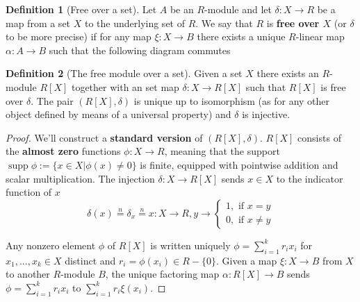 \documentclass[a4paper,12pt,parskip=half*,chapterprefix=true,numbers=noendperiod]{scrreprt}
\theoremstyle{definition}
\newtheorem{definition}{Definition}[section]
\theoremstyle{remark}
\begin{document}
\begin{definition}[Free over a set]
	Let $A$ be an $R$-module and let $\delta:X\to R$ be a map from a set $X$ to the underlying set of $R$. We say that $R$ is \textbf{free over $X$} (or $\delta$ to be more precise) if for any map $\xi:X\to B$ there exists a unique $R$-linear map $\alpha:A\to B$ such that the following diagram commutes
	\begin{figure}[H]
		\centering
	\end{figure}
\end{definition}

\begin{definition}[The free module over a set]
	Given a set $X$ there exists an $R$-module $R[X]$ together with an set map $\delta:X\to R[X]$ such that $R[X]$ is free over $\delta$. The pair $(R[X],\delta)$ is unique up to isomorphism (as for any other object defined by means of a universal property) and $\delta$ is injective.
\end{definition}
\begin{proof}
We'll construct a \textbf{standard version} of $(R[X],\delta)$. $R[X]$ consists of the \textbf{almost zero} functions $\phi:X\to R$, meaning that the support $\operatorname{supp}\phi:=\{x\in X|\phi(x)\neq 0\}$ is finite, equipped with pointwise addition and scalar multiplication. The injection $\delta:X\to R[X]$ sends $x\in X$ to the indicator function of $x$
\begin{equation*}
	\delta(x)\overset{n}{=}\delta_x\overset{n}{=}x:X\to R,y\to\begin{cases} 1,\text{ if }x=y\\
	0,\text{ if }x\neq y
	\end{cases}
\end{equation*}

Any nonzero element $\phi$ of $R[X]$ is written uniquely $\phi=\sum_{i=1}^kr_ix_i$ for $x_1,...,x_k\in X$ distinct and $r_i=\phi(x_i)\in R-\{0\}$. Given a map $\xi:X\to B$ from $X$ to another $R$-module $B$, the unique factoring map $\alpha:R[X]\to B$ sends $\phi=\sum_{i=1}^kr_ix_i$ to $\sum_{i=1}^kr_i\xi(x_i)$.
\end{proof}
\end{document}
